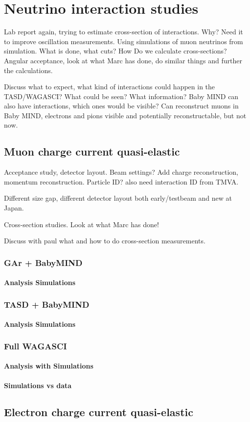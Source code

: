 \chapter{Neutrino interaction studies}
\label{c:neutrino}

Lab report again, trying to estimate cross-section of interactions. Why? Need it to improve oscillation measurements. Using simulations of muon neutrinos from simulation. What is done, what cuts? How Do we calculate cross-sections? Angular acceptance, look at what Marc has done, do similar things and further the calculations.

Discuss what to expect, what kind of interactions could happen in the TASD/WAGASCI? What could be seen? What information? Baby MIND can also have interactions, which ones would be visible? Can reconstruct muons in Baby MIND, electrons and pions visible and potentially reconstructable, but not now.


\section{Muon charge current quasi-elastic}

Acceptance study, detector layout. Beam settings? Add charge reconstruction, momentum reconstruction. Particle ID? also need interaction ID from TMVA.

Different size gap, different detector layout both early/testbeam and new at Japan.


Cross-section studies. Look at what Marc has done! 

Discuss with paul what and how to do cross-section measurements.

\subsection{GAr + BabyMIND}
\subsubsection{Analysis Simulations}
\subsection{TASD + BabyMIND}
\subsubsection{Analysis Simulations}
\subsection{Full WAGASCI}
\subsubsection{Analysis with Simulations}
\subsubsection{Simulations vs data}

\section{Electron charge current quasi-elastic}